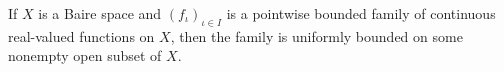 If $X$ is a Baire space and $(f_\iota)_{\iota \in I}$ is a pointwise bounded family of continuous real-valued functions on $X$, then the family is uniformly bounded on some nonempty open subset of $X$.

